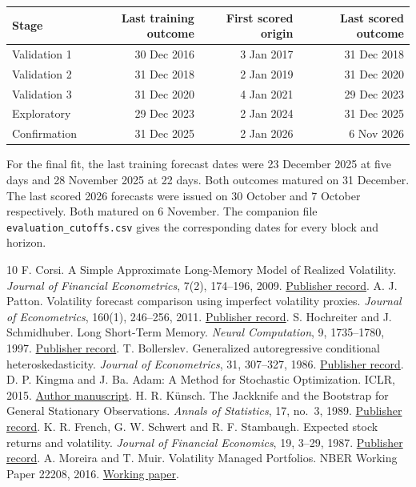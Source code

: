 \documentclass[11pt]{article}
\begin{document}
\begin{center}\small
\begin{tabular}{lrrr}\toprule
Stage & Last training outcome & First scored origin & Last scored outcome \\ \midrule
Validation 1 & 30 Dec 2016 & 3 Jan 2017 & 31 Dec 2018 \\
Validation 2 & 31 Dec 2018 & 2 Jan 2019 & 31 Dec 2020 \\
Validation 3 & 31 Dec 2020 & 4 Jan 2021 & 29 Dec 2023 \\
Exploratory & 29 Dec 2023 & 2 Jan 2024 & 31 Dec 2025 \\
Confirmation & 31 Dec 2025 & 2 Jan 2026 & 6 Nov 2026 \\
\bottomrule\end{tabular}\end{center}
For the final fit, the last training forecast dates were 23 December 2025 at five days and 28 November 2025 at 22 days. Both outcomes matured on 31 December. The last scored 2026 forecasts were issued on 30 October and 7 October respectively. Both matured on 6 November. The companion file \texttt{evaluation\_cutoffs.csv} gives the corresponding dates for every block and horizon.
{}
\begin{thebibliography}{10}
 F. Corsi. A Simple Approximate Long-Memory Model of Realized Volatility. \emph{Journal of Financial Econometrics}, 7(2), 174--196, 2009. \href{https://doi.org/10.1093/jjfinec/nbp001}{Publisher record}.
 A. J. Patton. Volatility forecast comparison using imperfect volatility proxies. \emph{Journal of Econometrics}, 160(1), 246--256, 2011. \href{https://doi.org/10.1016/j.jeconom.2010.03.034}{Publisher record}.
 S. Hochreiter and J. Schmidhuber. Long Short-Term Memory. \emph{Neural Computation}, 9, 1735--1780, 1997. \href{https://doi.org/10.1162/neco.1997.9.8.1735}{Publisher record}.
 T. Bollerslev. Generalized autoregressive conditional heteroskedasticity. \emph{Journal of Econometrics}, 31, 307--327, 1986. \href{https://doi.org/10.1016/0304-4076(86)90063-1}{Publisher record}.
 D. P. Kingma and J. Ba. Adam: A Method for Stochastic Optimization. ICLR, 2015. \href{https://arxiv.org/abs/1412.6980}{Author manuscript}.
 H. R. K\"unsch. The Jackknife and the Bootstrap for General Stationary Observations. \emph{Annals of Statistics}, 17, no.~3, 1989. \href{https://doi.org/10.1214/aos/1176347265}{Publisher record}.
 K. R. French, G. W. Schwert and R. F. Stambaugh. Expected stock returns and volatility. \emph{Journal of Financial Economics}, 19, 3--29, 1987. \href{https://doi.org/10.1016/0304-405X(87)90026-2}{Publisher record}.
 A. Moreira and T. Muir. Volatility Managed Portfolios. NBER Working Paper 22208, 2016. \href{https://www.nber.org/papers/w22208}{Working paper}.
\end{thebibliography}
\end{document}
